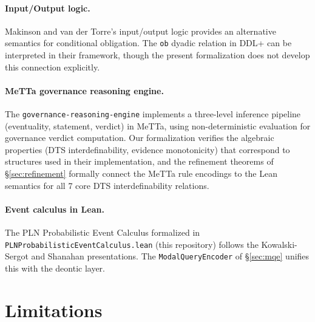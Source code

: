 \documentclass[]{article}
\newcommand{\code}[1]{\texttt{#1}}
\newcommand{\DDL}{\textup{DDL+}}
\newcommand{\DTS}{\textup{DTS}}
\newcommand{\PLN}{\textup{PLN}}
\begin{document}
\paragraph{Input/Output logic.}
Makinson and van der Torre's input/output logic \cite{MakinstonVanDerTorre2000}
provides an alternative semantics for conditional obligation.  The \code{ob}
dyadic relation in \DDL{} can be interpreted in their framework, though the
present formalization does not develop this connection explicitly.

\paragraph{MeTTa governance reasoning engine.}
The \code{governance-reasoning-engine} \cite{GovReasoningEngine} implements
a three-level inference pipeline (eventuality, statement, verdict) in MeTTa,
using non-deterministic evaluation for governance verdict computation.
Our formalization verifies the algebraic properties (\DTS{}
interdefinability, evidence monotonicity) that correspond to structures
used in their implementation, and the refinement theorems of
\S\ref{sec:refinement} formally connect the MeTTa rule encodings to the
Lean semantics for all 7 core \DTS{} interdefinability relations.

\paragraph{Event calculus in Lean.}
The \PLN{} Probabilistic Event Calculus formalized in
\code{PLNProbabilisticEventCalculus.lean} (this repository) follows the
Kowalski-Sergot \cite{KowalskiSergot1986} and Shanahan \cite{Shanahan1999}
presentations.  The \code{ModalQueryEncoder} of §\ref{sec:mqe} unifies this
with the deontic layer.

\section{Limitations}
\label{sec:limitations}
\end{document}
